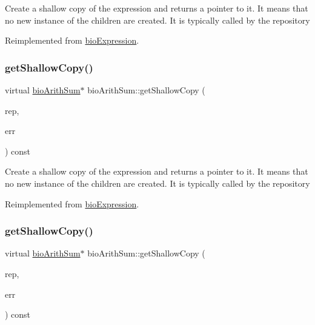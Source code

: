 Create a shallow copy of the expression and returns a pointer to it. It means that no new instance of the children are created. It is typically called by the repository 

Reimplemented from \hyperlink{classbio_expression_a442534762693b92baaf33928979a1bf8}{bio\+Expression}.

\mbox{\label{classbio_arith_sum_a0828ed33f49201118b143dfa336d9212}} 
\subsubsection{\texorpdfstring{get\+Shallow\+Copy()}{getShallowCopy()}\hspace{0.1cm}{\footnotesize\ttfamily [2/4]}}
{\footnotesize\ttfamily virtual \hyperlink{classbio_arith_sum}{bio\+Arith\+Sum}$\ast$ bio\+Arith\+Sum\+::get\+Shallow\+Copy (\begin{DoxyParamCaption}\item[{\hyperlink{classbio_expression_repository}{bio\+Expression\+Repository} $\ast$}]{rep,  }\item[{pat\+Error $\ast$\&}]{err }\end{DoxyParamCaption}) const\hspace{0.3cm}{\ttfamily [virtual]}}

Create a shallow copy of the expression and returns a pointer to it. It means that no new instance of the children are created. It is typically called by the repository 

Reimplemented from \hyperlink{classbio_expression_a442534762693b92baaf33928979a1bf8}{bio\+Expression}.

\mbox{\label{classbio_arith_sum_a0828ed33f49201118b143dfa336d9212}} 
\subsubsection{\texorpdfstring{get\+Shallow\+Copy()}{getShallowCopy()}\hspace{0.1cm}{\footnotesize\ttfamily [3/4]}}
{\footnotesize\ttfamily virtual \hyperlink{classbio_arith_sum}{bio\+Arith\+Sum}$\ast$ bio\+Arith\+Sum\+::get\+Shallow\+Copy (\begin{DoxyParamCaption}\item[{\hyperlink{classbio_expression_repository}{bio\+Expression\+Repository} $\ast$}]{rep,  }\item[{pat\+Error $\ast$\&}]{err }\end{DoxyParamCaption}) const\hspace{0.3cm}{\ttfamily [virtual]}}


